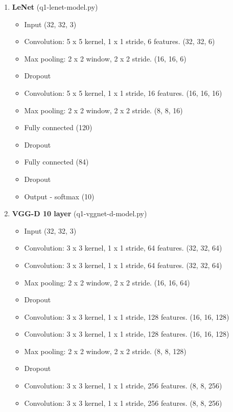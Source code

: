 \documentclass[11pt]{article}
\begin{document}
\begin{enumerate}
\begin{enumerate}
\begin{itemize}
            \end{itemize}
        \item \textbf{LeNet} (q1-lenet-model.py)
            \begin{itemize}
                \item Input (32, 32, 3)
                \item Convolution: 5 x 5 kernel, 1 x 1 stride, 6 features. (32, 32, 6)
                \item Max pooling: 2 x 2 window, 2 x 2 stride. (16, 16, 6)
                \item Dropout
                \item Convolution: 5 x 5 kernel, 1 x 1 stride, 16 features. (16, 16, 16)
                \item Max pooling: 2 x 2 window, 2 x 2 stride. (8, 8, 16)
                \item Fully connected (120)
                \item Dropout
                \item Fully connected (84)
                \item Dropout
                \item Output - softmax (10)
            \end{itemize}
        \item \textbf{VGG-D 10 layer} (q1-vggnet-d-model.py)
            \begin{itemize}
                \item Input (32, 32, 3)
                \item Convolution: 3 x 3 kernel, 1 x 1 stride, 64 features. (32, 32, 64)
                \item Convolution: 3 x 3 kernel, 1 x 1 stride, 64 features. (32, 32, 64)
                \item Max pooling: 2 x 2 window, 2 x 2 stride. (16, 16, 64)
                \item Dropout
                \item Convolution: 3 x 3 kernel, 1 x 1 stride, 128 features. (16, 16, 128)
                \item Convolution: 3 x 3 kernel, 1 x 1 stride, 128 features. (16, 16, 128)
                \item Max pooling: 2 x 2 window, 2 x 2 stride. (8, 8, 128)
                \item Dropout
                \item Convolution: 3 x 3 kernel, 1 x 1 stride, 256 features. (8, 8, 256)
                \item Convolution: 3 x 3 kernel, 1 x 1 stride, 256 features. (8, 8, 256)

\end{itemize}
\end{enumerate}
\end{enumerate}
\end{document}
